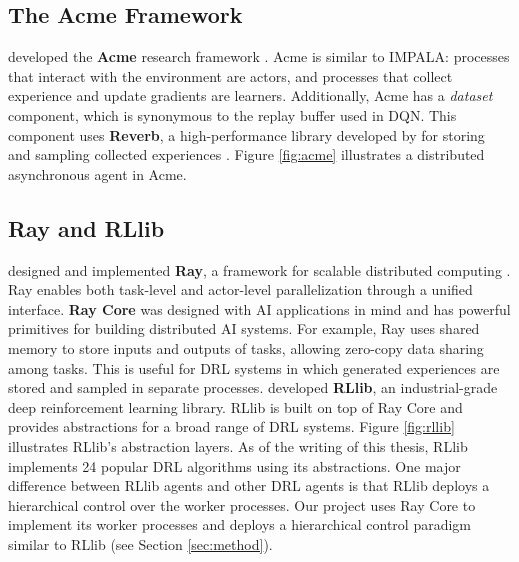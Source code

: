 \subsection{The Acme Framework}
\citeauthor{AcmeResearchFramework_Hoffman.Shahriari.ea_2020} developed the \textbf{Acme} research framework \cite{AcmeResearchFramework_Hoffman.Shahriari.ea_2020}.
Acme is similar to IMPALA:
processes that interact with the environment are actors,
and processes that collect experience and update gradients are learners.
Additionally, Acme has a \textit{dataset} component, which is synonymous to the replay buffer used in DQN.
This component uses \textbf{Reverb}, a high-performance library developed by \citeauthor{ReverbFrameworkExperience_Cassirer.Barth-Maron.ea_2021} for storing and sampling collected experiences \cite{ReverbFrameworkExperience_Cassirer.Barth-Maron.ea_2021}.
Figure \ref{fig:acme} illustrates a distributed asynchronous agent in Acme.

\subsection{Ray and RLlib} \label{sec:ray}
\citeauthor{RayDistributedFramework_Moritz.Nishihara.ea_2018} designed and implemented \textbf{Ray}, a framework for scalable distributed computing \cite{RayDistributedFramework_Moritz.Nishihara.ea_2018}.
Ray enables both task-level and actor-level parallelization through a unified interface.
\textbf{Ray Core} was designed with AI applications in mind and has powerful primitives for building distributed AI systems.
For example, Ray uses shared memory to store inputs and outputs of tasks, allowing zero-copy data sharing among tasks.
This is useful for DRL systems in which generated experiences are stored and sampled in separate processes.
\citeauthor{RLlibAbstractionsDistributed_Liang.Liaw.ea_2018} developed \textbf{RLlib}, an industrial-grade deep reinforcement learning library.
RLlib is built on top of Ray Core and provides abstractions for a broad range of DRL systems.
Figure \ref{fig:rllib} illustrates RLlib's abstraction layers.
As of the writing of this thesis, RLlib implements 24 popular DRL algorithms using its abstractions.
One major difference between RLlib agents and other DRL agents is that RLlib deploys a hierarchical control over the worker processes.
Our project uses Ray Core to implement its worker processes and deploys a hierarchical control paradigm similar to RLlib (see Section \ref{sec:method}).

